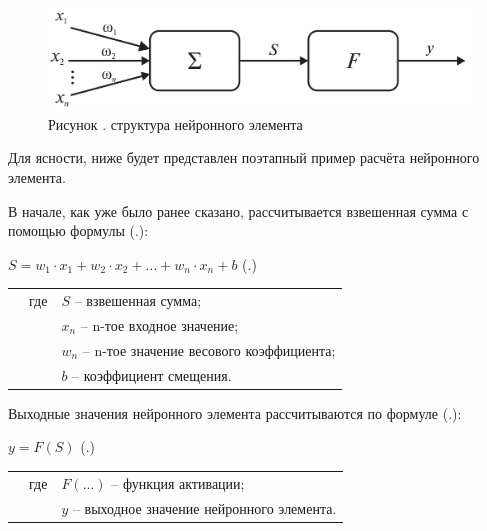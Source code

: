 {  \begin{figure}[H]
    \centering
    \def\svgwidth{\textwidth}
    \includegraphics[width=\textwidth]{images/Neuron.png}
    \caption*{\gostFont Рисунок \thechaptercntr .\theimagecntr \spc {--} структура нейронного элемента}
    \label{fig:Neuron}
  \end{figure} \addtocounter{imagecntr}{1}

  \par \redline Для ясности, ниже будет представлен поэтапный пример расчёта нейронного элемента.

  \par \redline В начале, как уже было ранее сказано, рассчитывается взвешенная сумма с помощью формулы (\thechaptercntr .\theformulacntr):

	\formulaspace
	\par \redline $S = w_1 \cdot x_1 + w_2 \cdot x_2 + \dots + w_n \cdot x_n + b$ \hfill (\thechaptercntr .\theformulacntr) \redline
	\formulaspace \addtocounter{formulacntr}{1}

  \begin{tabular}{p{}p{}p{}}
		& где  & $S$ {--} взвешенная сумма; \\
		& 	   & $x_n$ {--} n-тое входное значение; \\
    & 	   & $w_n$ {--} n-тое значение весового коэффициента; \\
    & 	   & $b$ {--} коэффициент смещения. \\
  \end{tabular}

  \par \redline Выходные значения нейронного элемента рассчитываются по формуле (\thechaptercntr .\theformulacntr):

	\formulaspace
	\par \redline $y = F \left(S\right)$ \hfill (\thechaptercntr .\theformulacntr) \redline
	\formulaspace \addtocounter{formulacntr}{1}

  \begin{tabular}{p{}p{}p{}}
		& где  & $F({...})$ {--} функция активации; \\
		& 	   & $y$ {--} выходное значение нейронного элемента. \\
  \end{tabular}

}
